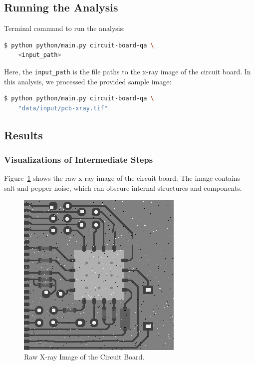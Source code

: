 \documentclass[a4paper,12pt]{article}
\begin{document}
\subsection{Running the Analysis}

Terminal command to run the analysis:

\begin{lstlisting}[language=bash]
$ python python/main.py circuit-board-qa \
    <input_path>
\end{lstlisting}

Here, the \texttt{input\_path} is the file paths to the x-ray image of the circuit board. In this analysis, we processed the provided sample image:

\begin{lstlisting}[language=bash]
$ python python/main.py circuit-board-qa \
    "data/input/pcb-xray.tif"
\end{lstlisting}

\subsection{Results}

\subsubsection{Visualizations of Intermediate Steps}

Figure~\ref{fig:image_raw} shows the raw x-ray image of the circuit board. The image contains salt-and-pepper noise, which can obscure internal structures and components.

\begin{figure}[!htbp]
    \centering
    \includegraphics[width=0.5\linewidth]{data/output/circuit_board_qa/image_raw.png}
    \caption{Raw X-ray Image of the Circuit Board.}
    \label{fig:image_raw}
\end{figure}
\end{document}
